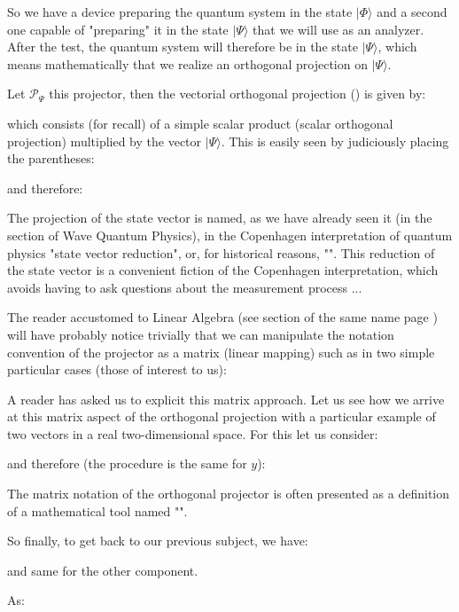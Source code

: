 	So we have a device preparing the quantum system in the state $|\Phi\rangle$ and a second one capable of "preparing" it in the state $|\Psi\rangle$ that we will use as an analyzer. After the test, the quantum system will therefore be in the state $|\Psi\rangle$, which means mathematically that we realize an orthogonal projection on $|\Psi\rangle$.

	Let $\mathcal{P}_\Psi$ this projector, then the vectorial orthogonal projection () is given by:
	
	which consists (for recall) of a simple scalar product (scalar orthogonal projection) multiplied by the vector $|\Psi\rangle$. This is easily seen by judiciously placing the parentheses:
	
	and therefore:
	
	The projection of the state vector is named, as we have already seen it (in the section of Wave Quantum Physics), in the Copenhagen interpretation of quantum physics "state vector reduction", or, for historical reasons, "". This reduction of the state vector is a convenient fiction of the Copenhagen interpretation, which avoids having to ask questions about the measurement process ...

	The reader accustomed to Linear Algebra (see section of the same name page \pageref{linear algebra}) will have probably notice trivially that we can manipulate the notation convention of the projector as a matrix (linear mapping) such as in two simple particular cases (those of interest to us):
	
	A reader has asked us to explicit this matrix approach. Let us see how we arrive at this matrix aspect of the orthogonal projection with a particular example of two vectors in a real two-dimensional space. For this let us consider:
	
	and therefore (the procedure is the same for $y$):
	
	\begin{tcolorbox}[title=Remark,colframe=black,arc=10pt]
	The matrix notation of the orthogonal projector is often presented as a definition of a mathematical tool named "".
	\end{tcolorbox}
	So finally, to get back to our previous subject, we have:
	
	and same for the other component.
	
	As:
	
